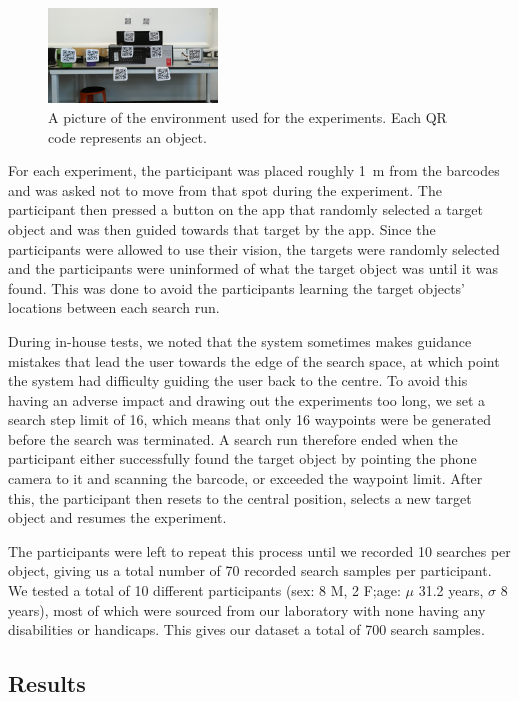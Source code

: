 \documentclass[a4paper, twoside]{article}
\begin{document}
\begin{figure}
  \centering
  \includegraphics[width=0.4\textwidth]{figures/test_env_picture.jpg}
  \caption{A picture of the environment used for the experiments. Each QR code represents an object. }\label{fig:env-picture}
\end{figure}

For each experiment, the participant was placed roughly \SI{1}{\meter} from the barcodes and was asked not to move from that spot during the experiment. The participant then pressed a button on the app that randomly selected a target object and was then guided towards that target by the app. Since the participants were allowed to use their vision, the targets were randomly selected and the participants were uninformed of what the target object was until it was found. This was done to avoid the participants learning the target objects' locations between each search run.

During in-house tests, we noted that the system sometimes makes guidance mistakes that lead the user towards the edge of the search space, at which point the system had difficulty guiding the user back to the centre. To avoid this having an adverse impact and drawing out the experiments too long, we set a search step limit of 16, which means that only 16 waypoints were be generated before the search was terminated. A search run therefore ended when the participant either successfully found the target object by pointing the phone camera to it and scanning the barcode, or exceeded the waypoint limit. After this, the participant then resets to the central position, selects a new target object and resumes the experiment.

The participants were left to repeat this process until we recorded 10 searches per object, giving us a total number of 70 recorded search samples per participant. We tested a total of 10 different participants (sex: 8 M, 2 F;\@ age: $\mu$ 31.2 years, $\sigma$ 8 years), most of which were sourced from our laboratory with none having any disabilities or handicaps. This gives our dataset a total of 700 search samples.

\subsection{Results}
\end{document}
